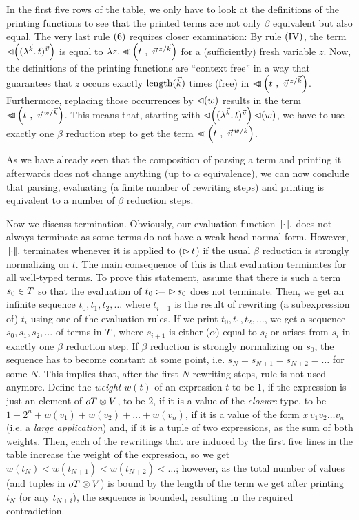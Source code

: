 \documentclass[submission,copyright,creativecommons]{eptcs}
\begin{document}
In the first five rows of the table, we only have to look at the definitions of the printing functions to see that the printed terms are not only $\beta$ equivalent but also equal. The very last rule $\lab 6$ requires closer examination: 
By rule $\lab {IV}$, the term $\prVal{\Val{\vec k} t {\vec v}}$ is equal to $\LaA z {\pr {t} {  \multiinsert{\vec v}{\vec k}{z}   }} $ for a (sufficiently) fresh variable $z$. Now, the definitions of the printing functions are ``context free'' in a way that guarantees  that $z$ occurs exactly $\length{\vec k}$ times (free) in $\pr {t} {  \multiinsert{\vec v}{\vec k}{z}   }$. Furthermore, replacing those occurrences by $\prVal{w}$ results in the term $\pr{t}{\multiinsert{\vec v}{\vec k}{w}}$. This means that, starting with 
$ \ApA{\prVal{\Val{\vec k} t {\vec v}}}{\prVal w}  $,
we have to use exactly one $\beta$ reduction step to get the term $  \pr{t}{\multiinsert{\vec v}{\vec k}{w}}  $.

As we have already seen that the composition of parsing a term and printing it afterwards does not change anything (up to $\alpha$ equivalence), we can now conclude that parsing, evaluating (a finite number of rewriting steps) and printing is equivalent to a number of $\beta$ reduction steps.

Now we discuss termination. Obviously, our evaluation function $\ev \cdot \cdot$ does not always terminate as some terms do not have a weak head normal form. However, $\ev \cdot \cdot$ terminates whenever it is applied to ($\parseFunE t$) if the usual $\beta$ reduction is strongly normalizing on $t$. 
The main consequence of this is that evaluation terminates for all well-typed terms. %
To prove this statement, assume that there is such a term $s_0 \in \te$ so that the evaluation of $t_0 := \parseFunE s_0$ does not terminate. 
%
Then, we get an infinite sequence $t_0, t_1, t_2, \ldots$ where $t_{i+1}$ is the result of rewriting (a subexpression of) $t_i$ using one of the evaluation rules. If we print $t_0, t_1, t_2, \ldots$, we get a sequence $s_0, s_1, s_2, \ldots$ of terms in $\te$, where $s_{i+1}$ is either ($\alpha$) equal to $s_i$ or arises from $s_i$ in exactly one $\beta$ reduction step. If $\beta$ reduction is strongly normalizing on $s_0$, the sequence has to become constant at some point, i.e. $s_N = s_{N+1} = s_{N+2} = \ldots$ for some $N$. This implies that, after the first $N$ rewriting steps, rule  is not used anymore. Define the \emph{weight} $w(t)$ of an expression $t$ to be $1$, if the expression is just an element of $\ot \otimes \va$, to be $2$, if it is a value of the \emph{closure} type, to be %
$1 + 2^n + w(v_1) + w(v_2) + \ldots + w(v_n)$, if it is a value of the form $x \, v_1 v_2 \ldots v_n$ (i.e. a \emph{large application}) and, if it is a tuple of two expressions, as the sum of both weights. Then, each of the rewritings that are induced by the first five lines in the table increase the weight of the expression, so we get $w(t_N) < w(t_{N+1}) < w(t_{N+2}) < \ldots$;  however, as the total number of values (and tuples in $\ot \otimes \va$) is bound by the length of the term we get after printing $t_N$ (or any $t_{N+i}$), the sequence is bounded, resulting in the required contradiction.
\end{document}
